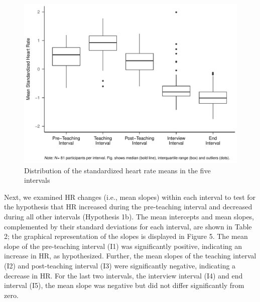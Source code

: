 \documentclass[preprint, 3p,
authoryear]{elsarticle} %
\begin{document}
\begin{figure}[htbp]
  \centering
  \includegraphics[width=1\textwidth]{plots_publication/box_plot.pdf}
  \caption{Distribution of the standardized heart rate means in the five intervals}
  \label{Distribution of the standardized heart rate means in the five intervals}
\end{figure}

Next, we examined HR changes (i.e., mean slopes) within each interval to
test for the hypothesis that HR increased during the pre-teaching
interval and decreased during all other intervals (Hypothesis 1b). The
mean intercepts and mean slopes, complemented by their standard
deviations for each interval, are shown in Table 2; the graphical
representation of the slopes is displayed in Figure 5. The mean slope of
the pre-teaching interval (I1) was significantly positive, indicating an
increase in HR, as hypothesized. Further, the mean slopes of the
teaching interval (I2) and post-teaching interval (I3) were
significantly negative, indicating a decrease in HR. For the last two
intervals, the interview interval (I4) and end interval (I5), the mean
slope was negative but did not differ significantly from zero.

\renewcommand{\arraystretch}{1.5}
\end{document}
